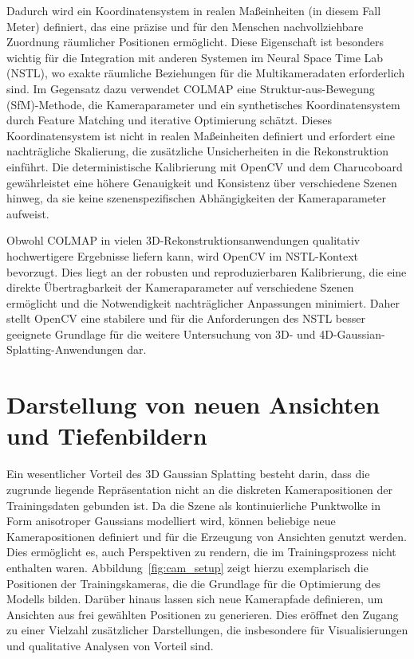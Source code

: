 Dadurch wird ein Koordinatensystem in realen Maßeinheiten (in diesem Fall Meter) definiert, das eine präzise und für den Menschen nachvollziehbare Zuordnung räumlicher Positionen ermöglicht.
Diese Eigenschaft ist besonders wichtig für die Integration mit anderen Systemen im Neural Space Time Lab (NSTL), wo exakte räumliche Beziehungen für die Multikameradaten erforderlich sind. 
Im Gegensatz dazu verwendet COLMAP eine Struktur-aus-Bewegung (SfM)-Methode, die Kameraparameter und ein synthetisches Koordinatensystem durch Feature Matching und iterative Optimierung schätzt. 
Dieses Koordinatensystem ist nicht in realen Maßeinheiten definiert und erfordert eine nachträgliche Skalierung, die zusätzliche Unsicherheiten in die Rekonstruktion einführt. 
Die deterministische Kalibrierung mit OpenCV und dem Charucoboard gewährleistet eine höhere Genauigkeit und Konsistenz über verschiedene Szenen hinweg, da sie keine szenenspezifischen Abhängigkeiten der Kameraparameter aufweist. 

Obwohl COLMAP in vielen 3D-Rekonstruktionsanwendungen qualitativ hochwertigere Ergebnisse liefern kann, wird OpenCV im NSTL-Kontext bevorzugt. Dies liegt an der robusten und reproduzierbaren Kalibrierung, die eine direkte Übertragbarkeit der Kameraparameter auf verschiedene Szenen ermöglicht und die Notwendigkeit nachträglicher Anpassungen minimiert.
Daher stellt OpenCV eine stabilere und für die Anforderungen des NSTL besser geeignete Grundlage für die weitere Untersuchung von 3D- und 4D-Gaussian-Splatting-Anwendungen dar.



\section{Darstellung von neuen Ansichten und Tiefenbildern}
\label{sec:new_views_depth}

Ein wesentlicher Vorteil des 3D Gaussian Splatting besteht darin, dass die zugrunde liegende Repräsentation nicht an die diskreten Kamerapositionen der Trainingsdaten gebunden ist. 
Da die Szene als kontinuierliche Punktwolke in Form anisotroper Gaussians modelliert wird, können beliebige neue Kamerapositionen definiert und für die Erzeugung von Ansichten genutzt werden. 
Dies ermöglicht es, auch Perspektiven zu rendern, die im Trainingsprozess nicht enthalten waren. 
Abbildung~\ref{fig:cam_setup} zeigt hierzu exemplarisch die Positionen der Trainingskameras, die die Grundlage für die Optimierung des Modells bilden. 
Darüber hinaus lassen sich neue Kamerapfade definieren, um Ansichten aus frei gewählten Positionen zu generieren. 
Dies eröffnet den Zugang zu einer Vielzahl zusätzlicher Darstellungen, die insbesondere für Visualisierungen und qualitative Analysen von Vorteil sind. 

